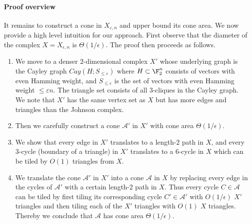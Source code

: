 \paragraph{Proof overview}It remains to construct a cone in $X_{\varepsilon,n}$ and upper bound its cone area. We now provide a high level intuition for our approach. 
First observe that the diameter of the complex $X=X_{\epsilon,n}$ is $\Theta(1/\epsilon)$.
The proof then proceeds as follows. 
\begin{enumerate}
    \item  We move to a denser $2$-dimensional complex $X'$ whose underlying graph is the Cayley graph $Cay(H; S_{\le \varepsilon})$ where $H\subset \F_2^n$ consists of vectors with even Hamming weight, and $S_{\le \varepsilon}$ is the set of vectors with even Hamming weight $\le \varepsilon n$. The triangle set consists of all $3$-cliques in the Cayley graph. We note that $X'$ has the same vertex set as $X$ but has more edges and triangles than the Johnson complex.
    
    \item Then we carefully construct a cone $\mathcal{A}'$ in $X'$ with cone area $\Theta(1/\epsilon)$.

    \item We show that every edge in $X'$ translates to a length-$2$ path in $X$, and every $3$-cycle (boundary of a triangle) in $X'$ translates to a $6$-cycle in $X$ which can be tiled by $O(1)$ triangles from $X$. 

    \item We translate the cone $\mathcal{A}'$ in $X'$ into a cone $\mathcal{A}$ in $X$ by replacing every edge in the cycles of $\mathcal{A}'$ with a certain length-$2$ path in $X$. Thus every cycle $C \in \mathcal{A}$ can be tiled by first tiling its corresponding cycle $C' \in \mathcal{A}'$ with $O(1/\epsilon)$ $X'$ triangles and then tiling each of the $X'$ triangles with $O(1)$ $X$ triangles. Thereby we conclude that $\mathcal{A}$ has cone area $\Theta(1/\epsilon)$.
\end{enumerate}

